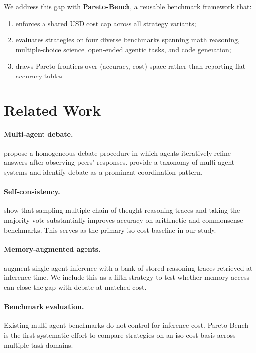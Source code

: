 \documentclass[11pt]{article}
\begin{document}
We address this gap with \textbf{Pareto-Bench}, a reusable benchmark framework
that:
\begin{enumerate}
    \item enforces a shared USD cost cap across all strategy variants;
    \item evaluates strategies on four diverse benchmarks spanning math
          reasoning, multiple-choice science, open-ended agentic tasks, and
          code generation;
    \item draws Pareto frontiers over (accuracy, cost) space rather than
          reporting flat accuracy tables.
\end{enumerate}

\section{Related Work}

\paragraph{Multi-agent debate.}
\citet{du2024improving} propose a homogeneous debate procedure in which agents
iteratively refine answers after observing peers' responses.  \citet{cemri2025mast}
provide a taxonomy of multi-agent systems and identify debate as a prominent
coordination pattern.

\paragraph{Self-consistency.}
\citet{wang2023selfconsistency} show that sampling multiple chain-of-thought
reasoning traces and taking the majority vote substantially improves accuracy
on arithmetic and commonsense benchmarks.  This serves as the primary
iso-cost baseline in our study.

\paragraph{Memory-augmented agents.}
\citet{ouyang2025reasoningbank} augment single-agent inference with a bank of
stored reasoning traces retrieved at inference time.  We include this as a
fifth strategy to test whether memory access can close the gap with debate at
matched cost.

\paragraph{Benchmark evaluation.}
Existing multi-agent benchmarks do not control for inference cost.
Pareto-Bench is the first systematic effort to compare strategies on an
iso-cost basis across multiple task domains.
\end{document}
